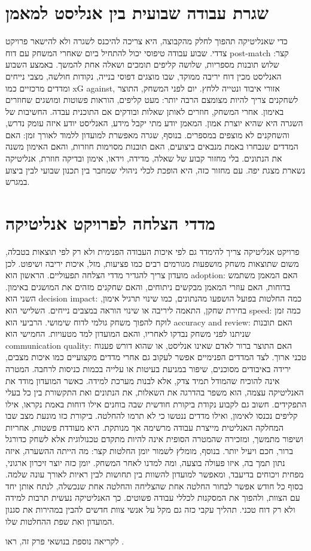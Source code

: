 \documentclass[11pt]{report}
\begin{document}
\section{שגרת עבודה שבועית בין אנליסט למאמן}
כדי שאנליטיקה תהפוך לחלק מהקבוצה, היא צריכה להיכנס לשגרה ולא להישאר פרויקט צדדי. שבוע עבודה טיפוסי יכול להתחיל ביום שאחרי המשחק עם דוח post-match קצר: שלוש תובנות מספריות, שלושה קליפים תומכים ושאלה אחת להמשך. באמצע השבוע האנליסט מכין דוח יריבה ממוקד, שבו מוצגים דפוסי בנייה, נקודות חולשה, מצבי נייחים ומדדים מרכזיים כמו xG against, אזורי איבוד ונטייה ללחץ. יום לפני המשחק, התוצר לשחקנים צריך להיות מצומצם הרבה יותר: מעט קליפים, הוראות פשוטות ומושגים שחוזרים באימון. אחרי המשחק, חוזרים לאותן שאלות ובודקים אם התוכנית עבדה. החשיבות של השגרה היא שהיא יוצרת אמון. המאמן יודע מתי יקבל מידע, האנליסט יודע איזה עומק נדרש, והשחקנים לא מוצפים במספרים. בנוסף, שגרה מאפשרת למועדון ללמוד לאורך זמן: האם המדדים שנבחרו באמת מנבאים ביצועים, האם תובנות מסוימות חוזרות, והאם האימון משנה את הנתונים. בלי מחזור קבוע של שאלה, מדידה, וידאו, אימון ובדיקה חוזרת, אנליטיקה נשארת מצגת יפה. עם מחזור כזה, היא הופכת לכלי ניהולי שמחבר בין תכנון שבועי לבין ביצוע במגרש.

\section{מדדי הצלחה לפרויקט אנליטיקה}
פרויקט אנליטיקה צריך להימדד גם לפי איכות העבודה הפנימית ולא רק לפי תוצאות בטבלה, משום שתוצאות משחק מושפעות מגורמים רבים כמו פציעות, מזל, איכות יריבה ושיפוט. לכן מועדון צריך להגדיר מדדי הצלחה תפעוליים. הראשון הוא adoption: האם המאמן משתמש בדוחות, האם עוזרי המאמן מבקשים ניתוחים, והאם שחקנים מזהים את המושגים באימון. השני הוא decision impact: כמה החלטות בפועל הושפעו מהנתונים, כמו שינוי תרגיל אימון, בחירת שחקן, התאמה ליריבה או שינוי הוראה במצבים נייחים. השלישי הוא speed: כמה זמן לוקח להפוך משחק גולמי לדוח שימושי. הרביעי הוא accuracy and review: האם תובנות שניתנו לפני משחק נבדקו לאחריו, והאם המועדון למד מטעויות. החמישי הוא communication quality: האם התוצר ברור לאדם שאינו אנליסט, או שהוא דורש פענוח טכני ארוך. לצד המדדים הפנימיים אפשר לעקוב גם אחרי מדדים מקצועיים כמו איכות מצבים, ירידה באיבודים מסוכנים, שיפור במניעת בעיטות או עלייה בכמות כניסות לרחבה. המטרה אינה להוכיח שהמודל תמיד צדק, אלא לבנות מערכת למידה. כאשר המועדון מודד את האנליטיקה עצמה, הוא משפר בהדרגה את השאלות, את הנתונים ואת התקשורת בין כל בעלי התפקידים. חשוב גם לקבוע נקודת ביקורת חודשית שבה בוחנים אילו דוחות באמת נקראו, אילו קליפים נכנסו לאימון, ואילו מדדים ננטשו כי לא תרמו להחלטה. ביקורת כזו מונעת מצב שבו המחלקה האנליטית מייצרת עבודה מרשימה אך מנותקת. היא מעודדת פשטות, אחריות ושיפור מתמשך, ומזכירה שהמטרה הסופית אינה להיות מתקדם טכנולוגית אלא לשחק כדורגל ברור, חכם ויעיל יותר. בנוסף, מומלץ לשמור יומן החלטות קצר: מה הייתה ההשערה, איזה נתון תמך בה, איזו פעולה בוצעה, ומה למדנו לאחר המשחק. יומן כזה יוצר זיכרון ארגוני, מפחית ויכוחים בדיעבד, ומאפשר למועדון להשוות בין תחושות לבין ראיות לאורך עונה שלמה. בסוף כל חודש אפשר לבחור החלטה אחת שהצליחה והחלטה אחת שנכשלה, לנתח אותן יחד עם הצוות, ולהפוך את המסקנות לכללי עבודה פשוטים. כך האנליטיקה נעשית תרבות למידה ולא רק דוח טכני. תהליך עקבי כזה גם מקל על אנשי צוות חדשים להבין במהירות את סגנון המועדון ואת שפת ההחלטות שלו.

לקריאה נוספת בנושאי פרק זה, ראו \cite{crewai_docs}.

\nocite{*}
\printbibliography
\end{document}
